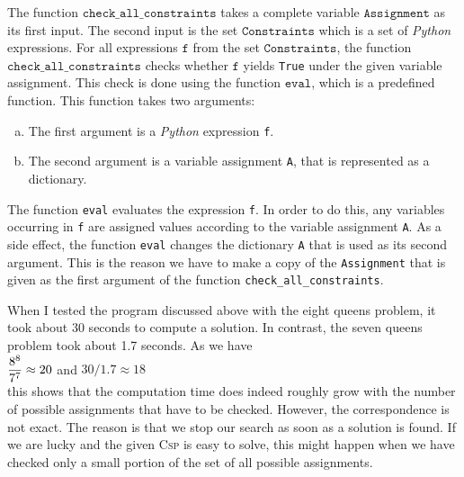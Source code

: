 The function $\texttt{check\_all\_constraints}$ takes a complete variable $\texttt{Assignment}$ as
its first input.  The second input is the set $\texttt{Constraints}$ which is a set of \textsl{Python}
expressions.  For all expressions
$\texttt{f}$ from the set $\texttt{Constraints}$, the function $\texttt{check\_all\_constraints}$ checks
whether $\texttt{f}$ yields \texttt{True} under the given variable assignment.
This check is done using the function $\texttt{eval}$, which is a predefined function.  
This function takes two arguments: 
\begin{enumerate}[(a)]
\item The first argument is a \textsl{Python} expression \texttt{f}.
\item The second argument is a variable assignment \texttt{A}, that is represented as a dictionary.
\end{enumerate}
The function \texttt{eval} evaluates the expression \texttt{f}.  In order to do this, any variables occurring
in \texttt{f} are assigned values according to the variable assignment \texttt{A}.  As a side effect, the function
\texttt{eval} changes the dictionary \texttt{A} that is used as its second argument.  This is the reason we have
to make a copy of the \texttt{Assignment} that is given as the first argument of the function
\texttt{check\_all\_constraints}. 

When I tested the program discussed above with the eight queens problem, it took about 30 seconds to
compute a solution.  In contrast, the seven queens problem took about 1.7 seconds.  As we have
\\[0.2cm]
\hspace*{1.3cm}
$\displaystyle\frac{8^8}{7^7} \approx 20$ \quad and \quad $30 / 1.7 \approx 18$ 
\\[0.2cm]
this shows that the computation time does indeed roughly grow with the number of possible assignments that
have to be checked.  However, the correspondence is not exact.  The reason is that we stop our
search as soon as a solution is found.  If we are lucky and the given \textsc{Csp} is easy to solve, this
might happen when we have checked only a small portion of the set of all possible assignments.

